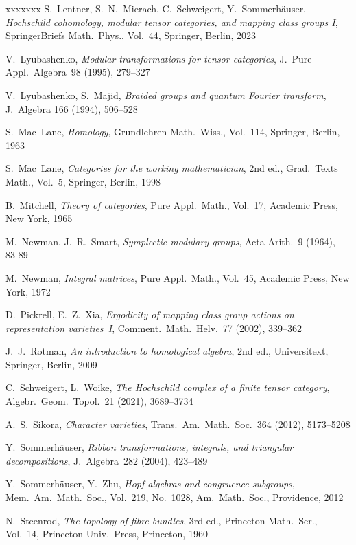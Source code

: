 \documentclass[12pt]{article}
\theoremstyle{definition}
\theoremstyle{break}
\renewcommand{\1}{\mathbbm{1}}
\begin{document}
\begin{thebibliography}{xxxxxxx}
S.~Lentner, S.~N.~Mierach, C.~Schweigert, Y.~Sommerh\"auser,
\emph{Hochschild cohomology, modular tensor categories, and mapping class groups I},
SpringerBriefs Math.~Phys., Vol.~44, Springer, Berlin, 2023

 V.~Lyubashenko, 
\emph{Modular transformations for tensor categories}, J.~Pure Appl.~Algebra~98 (1995), 279--327

 V.~Lyubashenko, S.~Majid, 
\emph{Braided groups and quantum Fourier transform}, J.~Algebra 166 (1994), 506--528

S.~Mac~Lane,
\emph{Homology},
Grundlehren Math.~Wiss., Vol.~114, Springer, Berlin, 1963

S.~Mac~Lane,
\emph{Categories for the working mathematician}, 2nd ed.,
Grad.\ Texts Math., Vol.~5, Springer, Berlin, 1998

B.~Mitchell,
\emph{Theory of categories},
Pure Appl.\ Math., Vol.~17, Academic Press, New York, 1965

M.~Newman, J.~R.~Smart,
\emph{Symplectic modulary groups},
Acta Arith.~9 (1964), 83-89

M.~Newman,
\emph{Integral matrices},
Pure Appl.\ Math., Vol.~45, Academic Press, New York, 1972

D.~Pickrell, E.~Z.~Xia,
\emph{Ergodicity of mapping class group actions on representation varieties~I},
Comment.~Math.~Helv.~77 (2002), 339--362

J.~J.~Rotman,
\emph{An introduction to homological algebra},
2nd ed., Universitext, Springer, Berlin, 2009

C.~Schweigert, L.~Woike,
\emph{The Hochschild complex of a finite tensor category},
Algebr.~Geom.~Topol.~21 (2021), 3689--3734

 A.~S.~Sikora,
\emph{Character varieties},
Trans.~Am.~Math.~Soc.~364 (2012), 5173--5208

 Y.~Sommerh\"auser,
\emph{Ribbon transformations, integrals, and triangular decompositions},
J.~Algebra~282 (2004), 423--489

Y.~Sommerh\"auser, Y.~Zhu,
\emph{Hopf algebras and congruence subgroups},
Mem.\ Am.\ Math.~Soc., Vol.~219, No.~1028, Am.~Math.~Soc., Providence, 2012

 N.~Steenrod,
\emph{The topology of fibre bundles},
3rd ed., Princeton Math.\ Ser., Vol.~14, Princeton Univ.~Press, Princeton, 1960


\end{thebibliography}
\end{document}
